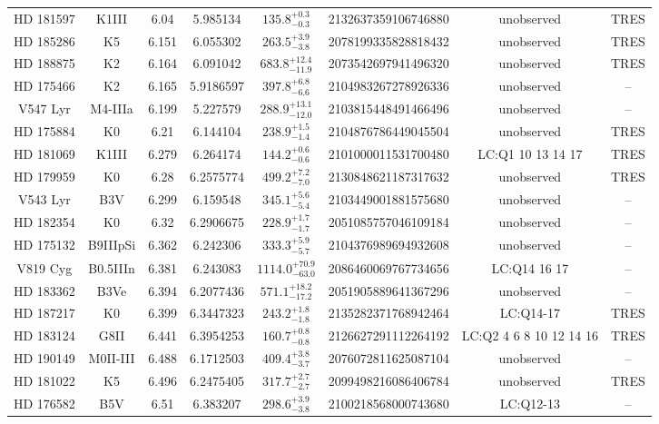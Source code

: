 \begin{table*}
\begin{tabular}{cccccccc}
HD 181597 & K1III & 6.04 & 5.985134 & $135.8^{+0.3}_{-0.3}$ & 2132637359106746880 & unobserved & TRES \\
HD 185286 & K5 & 6.151 & 6.055302 & $263.5^{+3.9}_{-3.8}$ & 2078199335828818432 & unobserved & TRES \\
HD 188875 & K2 & 6.164 & 6.091042 & $683.8^{+12.4}_{-11.9}$ & 2073542697941496320 & unobserved & TRES \\
HD 175466 & K2 & 6.165 & 5.9186597 & $397.8^{+6.8}_{-6.6}$ & 2104983267278926336 & unobserved & -- \\
V547 Lyr & M4-IIIa & 6.199 & 5.227579 & $288.9^{+13.1}_{-12.0}$ & 2103815448491466496 & unobserved & -- \\
HD 175884 & K0 & 6.21 & 6.144104 & $238.9^{+1.5}_{-1.4}$ & 2104876786449045504 & unobserved & TRES \\
HD 181069 & K1III & 6.279 & 6.264174 & $144.2^{+0.6}_{-0.6}$ & 2101000011531700480 & LC:Q1 10 13 14 17 & TRES \\
HD 179959 & K0 & 6.28 & 6.2575774 & $499.2^{+7.2}_{-7.0}$ & 2130848621187317632 & unobserved & TRES \\
V543 Lyr & B3V & 6.299 & 6.159548 & $345.1^{+5.6}_{-5.4}$ & 2103449001881575680 & unobserved & -- \\
HD 182354 & K0 & 6.32 & 6.2906675 & $228.9^{+1.7}_{-1.7}$ & 2051085757046109184 & unobserved & -- \\
HD 175132 & B9IIIpSi & 6.362 & 6.242306 & $333.3^{+5.9}_{-5.7}$ & 2104376989694932608 & unobserved & -- \\
V819 Cyg & B0.5IIIn & 6.381 & 6.243083 & $1114.0^{+70.9}_{-63.0}$ & 2086460069767734656 & LC:Q14 16 17 & -- \\
HD 183362 & B3Ve & 6.394 & 6.2077436 & $571.1^{+18.2}_{-17.2}$ & 2051905889641367296 & unobserved & -- \\
HD 187217 & K0 & 6.399 & 6.3447323 & $243.2^{+1.8}_{-1.8}$ & 2135282371768942464 & LC:Q14-17 & TRES \\
HD 183124 & G8II & 6.441 & 6.3954253 & $160.7^{+0.8}_{-0.8}$ & 2126627291112264192 & LC:Q2 4 6 8 10 12 14 16 & TRES \\
HD 190149 & M0II-III & 6.488 & 6.1712503 & $409.4^{+3.8}_{-3.7}$ & 2076072811625087104 & unobserved & -- \\
HD 181022 & K5 & 6.496 & 6.2475405 & $317.7^{+2.7}_{-2.7}$ & 2099498216086406784 & unobserved & TRES \\
HD 176582 & B5V & 6.51 & 6.383207 & $298.6^{+3.9}_{-3.8}$ & 2100218568000743680 & LC:Q12-13 & -- \\

\end{tabular}
\end{table*}
